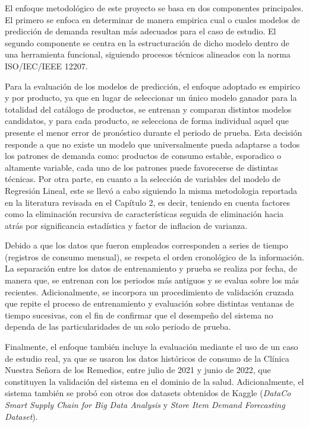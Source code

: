 El enfoque metodológico de este proyecto se basa en dos componentes principales. El primero se enfoca en determinar de manera empirica cual o cuales modelos de predicción de demanda resultan más adecuados para el caso de estudio. El segundo componente se centra en la estructuración de dicho modelo dentro de una herramienta funcional, siguiendo procesos técnicos alineados con la norma ISO/IEC/IEEE 12207. 

Para la evaluación de los modelos de predicción, el enfoque adoptado es empirico y por producto, ya que en lugar de seleccionar un único modelo ganador para la totalidad del catálogo de productos, se entrenan y comparan distintos modelos candidatos, y para cada producto, se selecciona de forma individual aquel que presente el menor error de pronóstico durante el periodo de prueba. Esta decisión responde a que no existe un modelo que universalmente pueda adaptarse a todos los patrones de demanda como: productos de consumo estable, esporadico o altamente variable, cada uno de los patrones puede favorecerse de distintas técnicas. Por otra parte, en cuanto a la selección de variables del modelo de Regresión Lineal, este se llevó a cabo siguiendo la misma metodologia reportada en la literatura revisada en el Capítulo 2, es decir, teniendo en cuenta factores como la eliminación recursiva de características seguida de eliminación hacia atrás por significancia estadística y factor de inflacion de varianza.

Debido a que los datos que fueron empleados corresponden a series de tiempo (registros de consumo mensual), se respeta el orden cronológico de la información. La separación entre los datos de entrenamiento y prueba se realiza por fecha, de manera que, se entrenan con los periodos más antiguos y se evalua sobre los más recientes. Adicionalmente, se incorpora un procedimiento de validación cruzada que repite el proceso de entrenamiento y evaluación sobre distintas ventanas de tiempo sucesivas, con el fin de confirmar que el desempeño del sistema no dependa de las particularidades de un solo periodo de prueba.

Finalmente, el enfoque también incluye la evaluación mediante el uso de un caso de estudio real, ya que se usaron los datos históricos de consumo de la Clínica Nuestra Señora de los Remedios, entre julio de 2021 y junio de 2022, que constituyen la validación del sistema en el dominio de la salud.
Adicionalmente, el sistema también se probó con otros dos datasets obtenidos de Kaggle (\textit{DataCo Smart Supply Chain for Big Data Analysis} y \textit{Store Item Demand Forecasting Dataset}).

